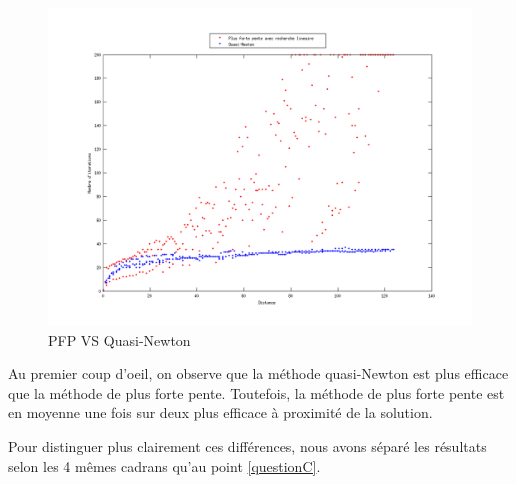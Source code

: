 \documentclass[11pt,a4paper,twoside,onecolumn,titlepage]{report}
\begin{document}
\begin{enumerate}[(a)]
\begin{figure}[h!]
	\centering
	\includegraphics[scale=0.9]{methods-allinone}
	\caption{PFP VS Quasi-Newton}
	\label{fig:pfp-vs-qn}
\end{figure}

Au premier coup d'oeil, on observe que la méthode quasi-Newton est plus efficace que la méthode de plus forte pente. Toutefois, la méthode de plus forte pente est en moyenne une fois sur deux plus efficace à proximité de la solution.

Pour distinguer plus clairement ces différences, nous avons séparé les résultats selon les 4 mêmes cadrans qu'au point \ref{questionC}.





\end{enumerate}
\end{document}
